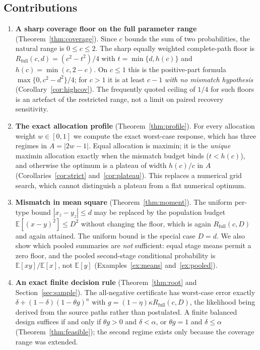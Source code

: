 \documentclass[11pt]{article}
\theoremstyle{definition}
\theoremstyle{remark}
\newcommand{\E}{\mathbb{E}}
\newcommand{\Rfull}{R_{\mathrm{full}}}
\newcommand{\hc}{h(c)}
\begin{document}
\subsection{Contributions}

\begin{enumerate}
\item \textbf{A sharp coverage floor on the full parameter range}
(Theorem~\ref{thm:coverage}). Since $c$ bounds the sum of two probabilities, the
natural range is $0\le c\le2$. The sharp equally weighted complete-path floor is
$\Rfull(c,d)=(c^2-t^2)/4$ with $t=\min\{d,\hc\}$ and $\hc=\min(c,2-c)$. On
$c\le1$ this is the positive-part formula $\max\{0,c^2-d^2\}/4$; for $c>1$ it is
at least $c-1$ \emph{with no mismatch hypothesis}
(Corollary~\ref{cor:highcov}). The frequently quoted ceiling of $1/4$ for such
floors is an artefact of the restricted range, not a limit on paired recovery
sensitivity.
\item \textbf{The exact allocation profile} (Theorem~\ref{thm:profile}). For
every allocation weight $w\in[0,1]$ we compute the exact worst-case response,
which has three regimes in $A=|2w-1|$. Equal allocation is maximin; it is the
\emph{unique} maximin allocation exactly when the mismatch budget binds
($t<\hc$), and otherwise the optimum is a plateau of width $\hc/c$ in $A$
(Corollaries~\ref{cor:strict} and~\ref{cor:plateau}). This replaces a numerical
grid search, which cannot distinguish a plateau from a flat numerical optimum.
\item \textbf{Mismatch in mean square} (Theorem~\ref{thm:moment}). The uniform
per-type bound $|x_z-y_z|\le d$ may be replaced by the population budget
$\E[(x-y)^2]\le D^2$ without changing the floor, which is again $\Rfull(c,D)$
and again attained. The uniform bound is the special case $D=d$. We also show
which pooled summaries are \emph{not} sufficient: equal stage means permit a
zero floor, and the pooled second-stage conditional probability is
$\E[xy]/\E[x]$, not $\E[y]$ (Examples~\ref{ex:means} and~\ref{ex:pooled}).
\item \textbf{An exact finite decision rule} (Theorem~\ref{thm:root} and
Section~\ref{sec:sample}). The all-negative certificate has worst-case error
exactly $\delta+(1-\delta)(1-\theta g)^n$ with $g=(1-\eta)\kappa\Rfull(c,D)$,
the likelihood being derived from the source paths rather than postulated. A
finite balanced design suffices if and only if $\theta g>0$ and $\delta<\alpha$,
or $\theta g=1$ and $\delta\le\alpha$ (Theorem~\ref{thm:feasible}); the second
regime exists only because the coverage range was extended.

\end{enumerate}
\end{document}
